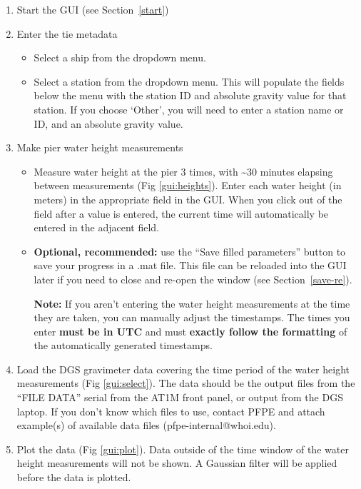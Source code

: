 \documentclass{pfpe-manual}
\begin{document}
\begin{enumerate}
\item Start the GUI (see Section~\ref{start})
\item Enter the tie metadata
    \begin{itemize}
    \item Select a ship from the dropdown menu.
    \item Select a station from the dropdown menu. This will populate the fields below the menu with the station ID and absolute gravity value for that station. If you choose `Other', you will need to enter a station name or ID, and an absolute gravity value.
    \end{itemize}
\item Make pier water height measurements
    \begin{itemize}
    \item Measure water height at the pier 3 times, with \textasciitilde 30 minutes elapsing between measurements (Fig \ref{gui:heights}). Enter each water height (in meters) in the appropriate field in the GUI. When you click out of the field after a value is entered, the current time will automatically be entered in the adjacent field.
    \item\textbf{Optional, recommended:} use the ``Save filled parameters'' button to save your progress in a .mat file. This file can be reloaded into the GUI later if you need to close and re-open the window (see Section~\ref{save-re}).
    \item[\textbf{Note:}] If you aren't entering the water height measurements at the time they are taken, you can manually adjust the timestamps. The times you enter \textbf{must be in UTC} and must \textbf{exactly follow the formatting} of the automatically generated timestamps.
    \end{itemize}
\item Load the DGS gravimeter data covering the time period of the water height measurements (Fig \ref{gui:select}). The data should be the output files from the ``FILE DATA'' serial from the AT1M front panel, or output from the DGS laptop. If you don't know which files to use, contact PFPE and attach example(s) of available data files (pfpe-internal@whoi.edu).
\item Plot the data (Fig \ref{gui:plot}). Data outside of the time window of the water height measurements will not be shown. A Gaussian filter will be applied before the data is plotted.


\end{enumerate}
\end{document}

